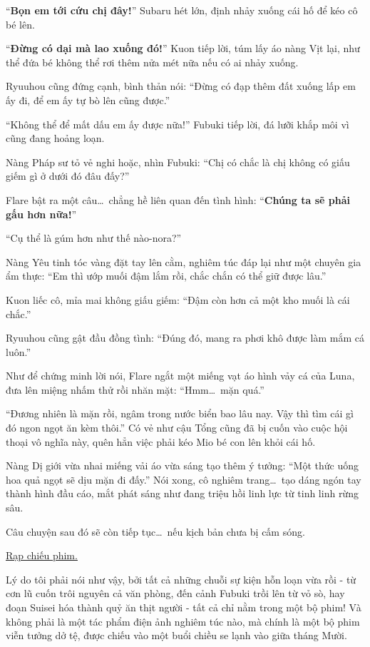 \documentclass[../main.tex]{subfiles}
\begin{document}
``\textbf{Bọn em tới cứu chị đây!}'' Subaru hét lớn, định nhảy xuống cái hố để kéo cô bé lên.

``\textbf{Đừng có dại mà lao xuống đó!}'' Kuon tiếp lời, túm lấy áo nàng Vịt lại, như thể đứa bé không thể rơi thêm nửa mét nữa nếu có ai nhảy xuống.

Ryuuhou cũng đứng cạnh, bình thản nói: ``Đừng có đạp thêm đất xuống lấp em ấy đi, để em ấy tự bò lên cũng được.''

``Không thể để mất dấu em ấy được nữa!'' Fubuki tiếp lời, đá lưỡi khắp môi vì cũng đang hoảng loạn.

Nàng Pháp sư tỏ vẻ nghi hoặc, nhìn Fubuki: ``Chị có chắc là chị không có giấu giếm gì ở dưới đó đâu đấy?''

Flare bật ra một câu\dots\ chẳng hề liên quan đến tình hình: ``\textbf{Chúng ta sẽ phải gấu hơn nữa!}''

``Cụ thể là gúm hơn như thế nào-nora?''

Nàng Yêu tinh tóc vàng đặt tay lên cằm, nghiêm túc đáp lại như một chuyên gia ẩm thực: ``Em thì ướp muối đậm lắm rồi, chắc chắn có thể giữ được lâu.''

Kuon liếc cô, mỉa mai không giấu giếm: ``Đậm còn hơn cả một kho muối là cái chắc.''

Ryuuhou cũng gật đầu đồng tình: ``Đúng đó, mang ra phơi khô được làm mắm cá luôn.''

Như để chứng minh lời nói, Flare ngắt một miếng vạt áo hình vảy cá của Luna, đưa lên miệng nhấm thử rồi nhăn mặt: ``Hmm\dots\ mặn quá.''

``Đương nhiên là mặn rồi, ngâm trong nước biển bao lâu nay. Vậy thì tìm cái gì đó ngon ngọt ăn kèm thôi.'' Có vẻ như cậu Tổng cũng đã bị cuốn vào cuộc hội thoại vô nghĩa này, quên hẳn việc phải kéo Mio bé con lên khỏi cái hố.

Nàng Dị giới vừa nhai miếng vải áo vừa sáng tạo thêm ý tưởng: ``Một thức uống hoa quả ngọt sẽ dịu mặn đi đấy.'' Nói xong, cô nghiêm trang\dots\ tạo dáng ngón tay thành hình đầu cáo, mắt phát sáng như đang triệu hồi linh lực từ tinh linh rừng sâu.

Câu chuyện sau đó sẽ còn tiếp tục\dots\ nếu kịch bản chưa bị cấm sóng.

\omk

\begin{center}
  \uline{Rạp chiếu phim.}
\end{center}

Lý do tôi phải nói như vậy, bởi tất cả những chuỗi sự kiện hỗn loạn vừa rồi - từ cơn lũ cuốn trôi nguyên cả văn phòng, đến cảnh Fubuki trồi lên từ vỏ sò, hay đoạn Suisei hóa thành quỷ ăn thịt người - tất cả chỉ nằm trong một bộ phim! Và không phải là một tác phẩm điện ảnh nghiêm túc nào, mà chính là một bộ phim viễn tưởng dở tệ, được chiếu vào một buổi chiều se lạnh vào giữa tháng Mười.
\end{document}
